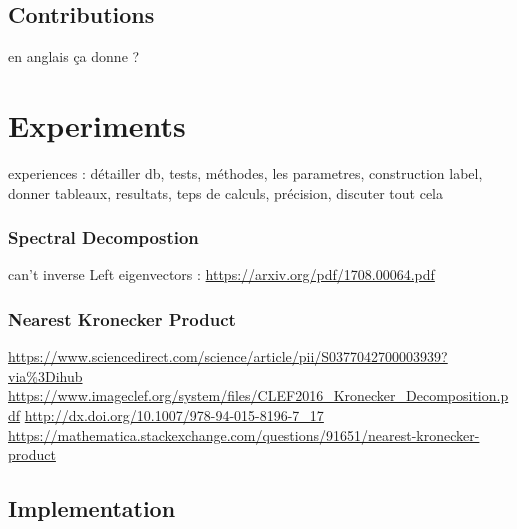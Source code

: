 \documentclass{article}
\theoremstyle{definition}
\begin{document}
\subsection{Contributions}
en anglais ça donne ?



\section{Experiments}
experiences : détailler db, tests, méthodes, les parametres, construction label, donner tableaux, resultats, teps de calculs, précision, discuter tout cela
\subsubsection{Spectral Decompostion}
can't inverse Left eigenvectors : 
\url{https://arxiv.org/pdf/1708.00064.pdf}
\subsubsection{Nearest Kronecker Product}
\url{https://www.sciencedirect.com/science/article/pii/S0377042700003939?via%3Dihub}
	\url{https://www.imageclef.org/system/files/CLEF2016_Kronecker_Decomposition.pdf}
	\url{http://dx.doi.org/10.1007/978-94-015-8196-7_17}
	\url{https://mathematica.stackexchange.com/questions/91651/nearest-kronecker-product}
	
\subsection{Implementation}
\end{document}
